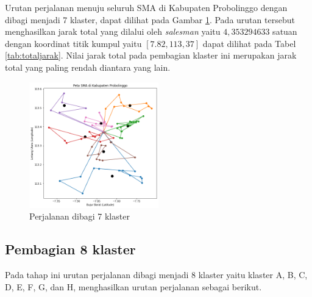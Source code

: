 Urutan perjalanan menuju seluruh SMA di Kabupaten Probolinggo dengan dibagi menjadi 7 klaster, dapat dilihat pada Gambar \ref{fig:hasil_mtsp7}. Pada urutan tersebut menghasilkan jarak total yang dilalui oleh \textit{salesman} yaitu $4,353294633$ satuan dengan koordinat titik kumpul yaitu $[7.82, 113,37]$ dapat dilihat pada Tabel \ref{tab:totaljarak}. Nilai jarak total pada pembagian klaster ini merupakan jarak total yang paling rendah diantara yang lain.

\begin{figure}[H]
\centering
\includegraphics[width=0.5\textwidth]{Gambar/hasil_mtsp/7}
\caption{Perjalanan dibagi 7 klaster}
\label{fig:hasil_mtsp7}
\end{figure}

\subsection{Pembagian 8 klaster}

Pada tahap ini urutan perjalanan dibagi menjadi 8 klaster yaitu klaster A, B, C, D, E, F, G, dan H, menghasilkan urutan perjalanan sebagai berikut.

